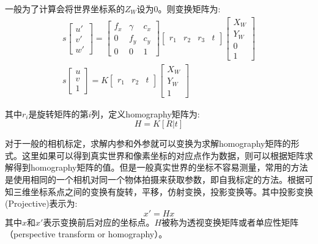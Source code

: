 \documentclass[12pt]{book}
\begin{document}
一般为了计算会将世界坐标系的$Z_W$设为0\cite{zhang2000flexible}。则变换矩阵为:
\begin{equation}\label{homography_translation}
\begin{array}{l}
	s\left[ {\begin{array}{*{20}{c}}
			{u'}\\
			{v'}\\
			{w'}
	\end{array}} \right] = \left[ {\begin{array}{*{20}{c}}
			{{f_x}}&\gamma &{{c_x}}\\
			0&{{f_y}}&{{c_y}}\\
			0&0&1
	\end{array}} \right][\begin{array}{*{20}{c}}
		{{r_1}}&{{r_2}}&{{r_3}}&t
	\end{array}]\left[ {\begin{array}{*{20}{c}}
			{{X_W}}\\
			{{Y_W}}\\
			0\\
			1
	\end{array}} \right]\\
	s\left[ {\begin{array}{*{20}{c}}
			u\\
			v\\
			1
	\end{array}} \right] = K[\begin{array}{*{20}{c}}
		{{r_1}}&{{r_2}}&t
	\end{array}]\left[ {\begin{array}{*{20}{c}}
			{{X_W}}\\
			{{Y_W}}\\
			1
	\end{array}} \right]
\end{array}
\end{equation}

其中$r_i$是旋转矩阵的第$i$列，定义homography矩阵为:
\begin{equation}\label{homography}
H = K[R|t]
\end{equation}


对于一般的相机标定，求解内参和外参就可以变换为求解homography矩阵的形式。这里如果可以得到真实世界和像素坐标的对应点作为数据，则可以根据矩阵求解得到homography矩阵的值。但是一般真实世界的坐标不容易测量，常用的方法是使用相同的一个相机对同一个物体拍摄来获取参数，即自我标定的方法\cite{Hartley1994SelfCalibrationFM}。根据\cite{computevision}可知三维坐标系点之间的变换有旋转，平移，仿射变换，投影变换等。其中投影变换(Projective)表示为:
\[x' = Hx\]
其中$x$和$x'$表示变换前后对应的坐标点。$H$被称为透视变换矩阵或者单应性矩阵（perspective transform or homography）。
\end{document}
